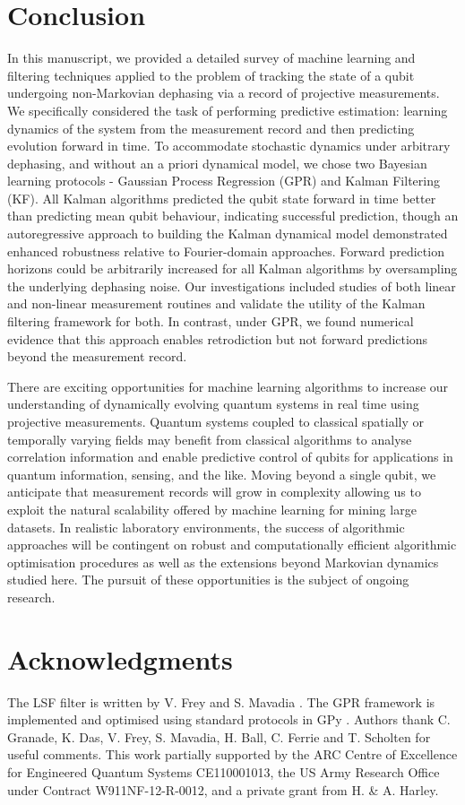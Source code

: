 \section{Conclusion \label{sec:main:Conclusion}}

In this manuscript, we provided a detailed survey of machine learning and filtering techniques applied to the problem of tracking the state of a qubit undergoing non-Markovian dephasing via a record of projective measurements.  We specifically considered the task of performing predictive estimation: learning dynamics of the system from the measurement record and then predicting evolution forward in time. To accommodate stochastic dynamics under arbitrary dephasing, and without an a priori dynamical model, we chose two Bayesian learning protocols - Gaussian Process Regression (GPR) and Kalman Filtering (KF).  All Kalman algorithms predicted the qubit state forward in time better than predicting mean qubit behaviour, indicating successful prediction, though an autoregressive approach to building the Kalman dynamical model demonstrated enhanced robustness relative to Fourier-domain approaches.  Forward prediction horizons could be arbitrarily increased for all Kalman algorithms by oversampling the underlying dephasing noise.  Our investigations included studies of both linear and non-linear measurement routines and validate the utility of the Kalman filtering framework for both.  In contrast, under GPR, we found numerical evidence that this approach enables retrodiction but not forward predictions beyond the measurement record.  

There are exciting opportunities for machine learning algorithms to increase our understanding of dynamically evolving quantum systems in real time using projective measurements. Quantum systems coupled to classical spatially or temporally varying fields may benefit from classical algorithms to analyse correlation information and enable predictive control of qubits for applications in quantum information, sensing, and the like. Moving beyond a single qubit, we anticipate that measurement records will grow in complexity allowing us to exploit the natural scalability offered by machine learning for mining large datasets. In realistic laboratory environments, the success of algorithmic approaches will be contingent on robust and computationally efficient algorithmic optimisation procedures as well as the extensions beyond Markovian dynamics studied here. The pursuit of these opportunities is the subject of ongoing research.

\section{Acknowledgments}
The LSF filter is written by V. Frey and S. Mavadia \cite{mavadia2017}. The GPR framework is implemented and optimised using standard protocols in GPy \cite{gpy2014}. Authors thank C. Granade, K. Das, V. Frey, S. Mavadia, H. Ball, C. Ferrie and T. Scholten for useful comments. This work partially supported by the ARC Centre of Excellence for Engineered Quantum Systems CE110001013, the US Army Research Office under Contract W911NF-12-R-0012, and a private grant from H. \& A. Harley.
